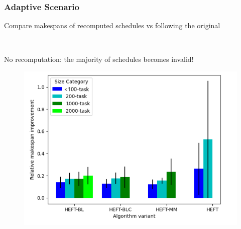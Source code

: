 \documentclass[xcolor=svgnames,titlepage,english,presentation]{beamer}
\begin{document}
\begin{frame}
    \frametitle{Adaptive Scenario}

    \vspace{-1cm}

    Compare makespans of recomputed schedules vs following the original

    ~~~~

    No recomputation: the majority of schedules becomes invalid!

    \pause
   
      
        \begin{figure}
            \centering
            \includegraphics[scale=0.3]{diagrams/images/MsImprovDynamicCCGRID.png}
          
        \end{figure}
   
\end{frame}
\end{document}
